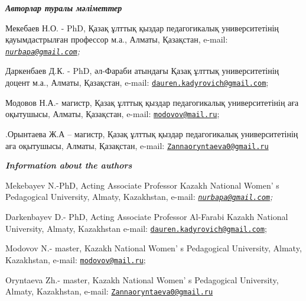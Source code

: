 \begin{authorinfo}
\emph{{\bfseries Авторлар туралы мәліметтер}}

Мекебаев Н.О. - PhD, Қазақ ұлттық қыздар педагогикалық университетінің
қауымдастрылған профессор м.а., Алматы, Қазақстан, e-mail:
\emph{\href{mailto:nurbapa@gmail.com}{\nolinkurl{nurbapa@gmail.com}};}

Даркенбаев Д.К. - PhD, әл-Фараби атындағы Қазақ ұлттық
университетінің доцент м.а., Алматы, Қазақстан, e-mail:
\href{mailto:dauren.kadyrovich@gmail.com}{\nolinkurl{dauren.kadyrovich@gmail.com}};

Модовов Н.А.- магистр, Қазақ ұлттық қыздар педагогикалық
университетінің аға оқытушысы, Алматы, Қазақстан, e-mail:
\href{mailto:modovov@mail.ru}{\nolinkurl{modovov@mail.ru}};

.Орынтаева Ж.А -- магистр, Қазақ ұлттық қыздар педагогикалық
университетінің аға оқытушысы, Алматы, Қазақстан, e-mail:
\href{mailto:Zannaoryntaeva0@gmail.ru}{\nolinkurl{Zannaoryntaeva0@gmail.ru}}

\emph{{\bfseries Information about the authors}}

Mekebayev N.-PhD, Acting Associate Professor Kazakh National
Women' s Pedagogical University, Almaty, Kazakhstan,
e-mail:
\emph{\href{mailto:nurbapa@gmail.com}{\nolinkurl{nurbapa@gmail.com}};}

Darkenbayev D.- PhD, Acting Associate Professor Al-Farabi Kazakh
National University, Almaty, Kazakhstan e-mail:
\href{mailto:dauren.kadyrovich@gmail.com}{\nolinkurl{dauren.kadyrovich@gmail.com}};

Modovov N.- master, Kazakh National Women' s Pedagogical
University, Almaty, Kazakhstan, e-mail:
\href{mailto:modovov@mail.ru}{\nolinkurl{modovov@mail.ru}};

Oryntaeva Zh.- master, Kazakh National Women' s
Pedagogical University, Almaty, Kazakhstan, e-mail:
\href{mailto:Zannaoryntaeva0@gmail.ru}{\nolinkurl{Zannaoryntaeva0@gmail.ru}}
\end{authorinfo}

